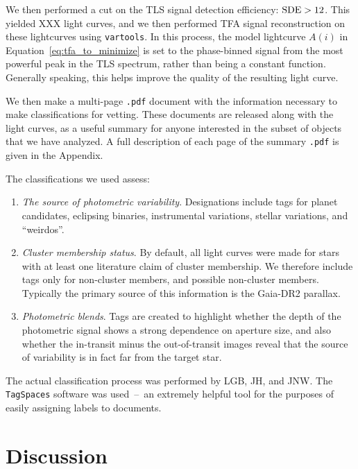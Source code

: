 \documentclass[12pt,twocolumn,tighten]{aastex62}
\begin{document}
We then performed a cut on the TLS signal detection efficiency:
${\rm SDE} > 12$.
This yielded XXX light curves, and we then
performed TFA signal reconstruction on these lightcurves using 
\texttt{vartools}.
In this process, the model lightcurve $A(i)$ in 
Equation~\ref{eq:tfa_to_minimize} is set to the phase-binned signal from the 
most powerful peak in the TLS spectrum, rather than being a constant function. 
Generally speaking, this helps improve the quality of the resulting light 
curve.

We then make a multi-page \texttt{.pdf} document with the information 
necessary to make classifications for vetting.
These documents are released along with the light curves, as a useful summary
 for anyone interested in the subset of objects that we have analyzed.
A full description of each page of the summary \texttt{.pdf} is given in the 
Appendix.

The classifications we used assess:
\begin{enumerate}
    \item {\it The source of photometric variability}. Designations include 
    tags for planet candidates, eclipsing binaries, instrumental variations, 
    stellar variations, and ``weirdos''.
    \item {\it Cluster membership status}. By default, all light curves were 
    made for stars with at least one literature claim of cluster membership.  
    We therefore include tags only for non-cluster members, and possible 
    non-cluster members. Typically the primary source of this information is 
    the Gaia-DR2 parallax.
    \item {\it Photometric blends}. Tags are created to highlight whether the 
    depth of the photometric signal shows a strong dependence on aperture 
    size, and also whether the in-transit minus the out-of-transit images 
    reveal that the source of variability is in fact far from the target star.
\end{enumerate}
The actual classification process was performed by LGB, JH, and JNW.
The \texttt{TagSpaces} software was used~--~an extremely helpful tool for the 
purposes of easily assigning labels to documents.






\section{Discussion}
\label{sec:discussion}
\end{document}
